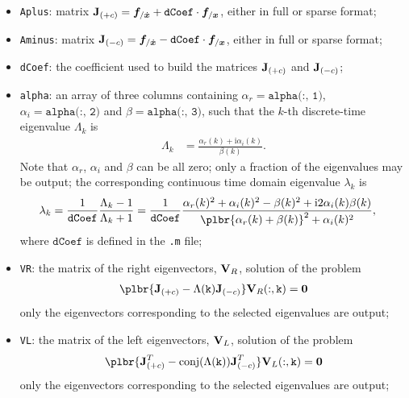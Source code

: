\begin{itemize}
\item \texttt{Aplus}: 
matrix
$\bm{\mathbf J}_{(+c)} = \boldsymbol{f}_{/\dot{\boldsymbol{x}}} + \texttt{dCoef} \cdot \boldsymbol{f}_{/\boldsymbol{x}}$,
either in full or sparse format;

\item \texttt{Aminus}: 
matrix
$\bm{\mathbf J}_{(-c)} = \boldsymbol{f}_{/\dot{\boldsymbol{x}}} - \texttt{dCoef} \cdot \boldsymbol{f}_{/\boldsymbol{x}}$,
either in full or sparse format;

\item \texttt{dCoef}: the coefficient used to build the matrices
$\bm{\mathbf J}_{(+c)}$ and $\bm{\mathbf J}_{(-c)}$;

\item \texttt{alpha}:
an array of three columns containing
$\alpha_r = \texttt{alpha(:, 1)}$,
$\alpha_i = \texttt{alpha(:, 2)}$
and $\beta = \texttt{alpha(:, 3)}$,
such that the $k$-th discrete-time eigenvalue $\Lambda_k$ is
\begin{align}
	\Lambda_k
	&=
	\frac{\alpha_r(k) + \text{i} \alpha_i(k)}{\beta(k)}
	.
\end{align}
Note that $\alpha_r$, $\alpha_i$ and $\beta$ can be all zero;
only a fraction of the eigenvalues may be output;
the corresponding continuous time domain eigenvalue $\lambda_k$ is
\begin{align}
        \label{sec:PROBLEMS:eigenvalues}
	\lambda_k
	&=
	\frac{1}{\texttt{dCoef}}
	\frac{\Lambda_k - 1}{\Lambda_k + 1}
	=
	\frac{1}{\texttt{dCoef}}
	\frac{
		\alpha_r(k)^2
		+
		\alpha_i(k)^2
		-
		\beta(k)^2
		+
		\text{i} 2 \alpha_i(k) \beta(k)
	}{
		\plbr{\alpha_r(k) + \beta(k)}^2 + \alpha_i(k)^2
	}
	,
\end{align}
where $\texttt{dCoef}$ is defined in the \texttt{.m} file;

\item \texttt{VR}: the matrix of the right eigenvectors, $\bm{\mathbf V}_R$, solution of the problem
\begin{align*}
	\plbr{\TT{J}_{(+c)} - \Lambda(\mathtt{k}) \TT{J}_{(-c)}} \TT{V}_R(:,\mathtt{k}) = \T{0}
\end{align*}
only the eigenvectors corresponding to the selected eigenvalues are output;

\item \texttt{VL}: the matrix of the left eigenvectors, $\bm{\mathbf V}_L$, solution of the problem
\begin{align*}
	\plbr{\TT{J}_{(+c)}^T - \mathrm{conj}(\Lambda(\mathtt{k})) \TT{J}_{(-c)}^T} \TT{V}_L(:, \mathtt{k}) = \T{0}
\end{align*}
only the eigenvectors corresponding to the selected eigenvalues are output;


\end{itemize}

